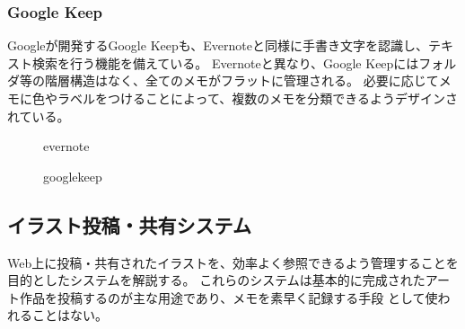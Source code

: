 \subsubsection{Google Keep}

Googleが開発するGoogle Keepも、Evernoteと同様に手書き文字を認識し、テキスト検索を行う機能を備えている。
Evernoteと異なり、Google Keepにはフォルダ等の階層構造はなく、全てのメモがフラットに管理される。
必要に応じてメモに色やラベルをつけることによって、複数のメモを分類できるようデザインされている。

\begin{figure}[htbp] \begin{minipage}{0.5\hsize}
                         \begin{center} 
                         \end{center} \caption{evernote} \label{fig:evernote}
\end{minipage} \begin{minipage}{0.5\hsize}
                   \begin{center} 
                   \end{center} \caption{googlekeep} \label{fig:googlekeep}
\end{minipage}
\end{figure}

\subsection{イラスト投稿・共有システム}
Web上に投稿・共有されたイラストを、効率よく参照できるよう管理することを目的としたシステムを解説する。
これらのシステムは基本的に完成されたアート作品を投稿するのが主な用途であり、メモを素早く記録する手段
として使われることはない。

